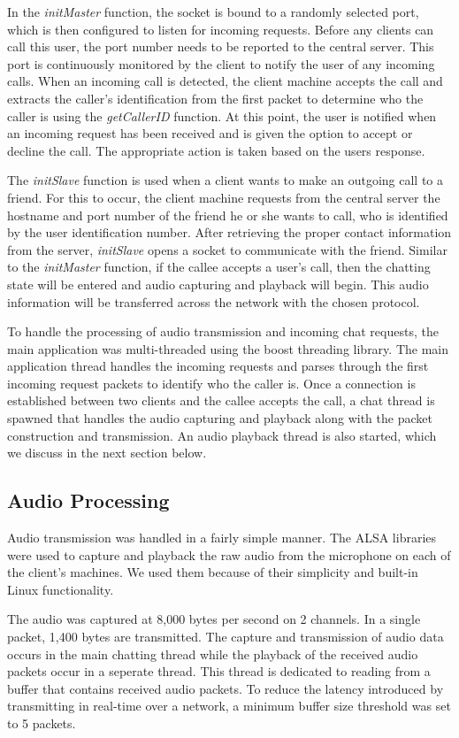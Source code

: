 In the \textit{initMaster} function, the socket is bound to a randomly selected 
port, which is then configured to listen for incoming requests. 
Before any clients can call this user, the port number needs to be reported to
the central server. This port is continuously 
monitored by the client to notify the user of any incoming calls.  When an incoming
call is detected, the client machine accepts the call and extracts the caller's 
identification from the first packet to determine who the caller is using the 
\textit{getCallerID} function.  At this point, the user is notified when an 
incoming request has been received and is given the option to accept or decline
the call.  The appropriate action is taken based on the users response.

The \textit{initSlave} function is used when a client wants to make an outgoing
call to a friend.  For this to occur, the client machine requests from the central 
server the hostname and port number of the friend he or she wants to call, who is
identified by the user identification number.  After retrieving the proper contact 
information from the server, \textit{initSlave} opens a socket to 
communicate with the friend.  Similar to the \textit{initMaster} function, if the
callee accepts a user's call, then the chatting state will be entered and audio
capturing and playback will begin. This audio information will be transferred across
the network with the chosen protocol.

To handle the processing of audio transmission and incoming chat requests, the
main application was multi-threaded using the boost threading library. The main
application thread handles the incoming requests and parses through the first
incoming request packets to identify who the caller is. Once a connection
is established between two clients and the callee accepts the call, a chat
thread is spawned that handles the audio capturing and playback along with the 
packet construction and transmission. An audio playback thread is also started, which we discuss in the next section below.


\subsection{Audio Processing}
\label{subsec:audio_proc}

Audio transmission was handled in a fairly simple manner. The ALSA libraries
were used to capture and playback the raw audio from the microphone on each of the 
client's machines. We used them because of their simplicity and
built-in Linux functionality.

The audio was captured at 8,000 bytes per second on 2 channels.  In a 
single packet, 1,400 bytes are transmitted.  The capture and transmission of audio 
data occurs in the main chatting thread while the playback of the received audio 
packets occur in a seperate thread. This thread is dedicated to reading from
a buffer that contains received audio packets. To reduce the latency 
introduced by transmitting in real-time over a network, a minimum buffer size
threshold was set to 5 packets.

